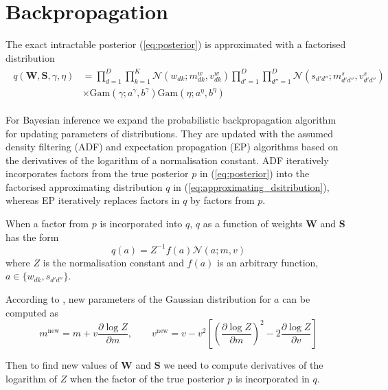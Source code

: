 \documentclass{article}
\begin{document}
\section{Backpropagation}
\label{sec:backpropagation}

The exact intractable posterior (\ref{eq:posterior}) is approximated with a factorised distribution
\begin{align}
\label{eq:approximating_dsitribution}
\begin{split}
q(\mathbf{W}, \mathbf{S}, \gamma, \eta) &= \prod_{d=1}^D\prod_{k=1}^K \mathcal{N}(w_{dk} ; m^w_{dk}, v^w_{dk}) \prod_{d'=1}^D\prod_{d''=1}^D \mathcal{N}(s_{d'd''} ; m^s_{d'd''}, v^s_{d'd''}) \\
&\times \text{Gam}(\gamma; a^\gamma, b^\gamma) \text{Gam}(\eta; a^\eta, b^\eta)
\end{split}
\end{align}

For Bayesian inference we expand the probabilistic backpropagation algorithm~\cite{hernandez2015probabilistic} for updating parameters of distributions. They are updated with the assumed density filtering (ADF) and expectation propagation (EP) algorithms based on the derivatives of the logarithm of a normalisation constant. ADF iteratively incorporates factors from the true posterior $p$ in (\ref{eq:posterior}) into the factorised approximating distribution $q$ in (\ref{eq:approximating_dsitribution}), whereas EP iteratively replaces factors in $q$ by factors from $p$.

When a factor from $p$ is incorporated into $q$, $q$ as a function of weights $\mathbf{W}$ and $\mathbf{S}$ has the form
\begin{equation}
q(a) = Z^{-1}f(a)\mathcal{N}(a; m, v)
\end{equation}
where $Z$ is the normalisation constant and $f(a)$ is an arbitrary function, $a \in \{w_{dk}, s_{d'd''}\}$.

According to \cite{minka2001thesis}, new parameters of the Gaussian distribution for $a$ can be computed as
\begin{equation}
\label{eq:param_update}
m^{\text{new}} = m + v \frac{\partial \log Z}{\partial m}, \qquad
v^{\text{new}} = v - v^2\left[ \left(\frac{\partial \log Z}{\partial m}\right)^2 - 2 \frac{\partial \log Z}{\partial v}\right]
\end{equation}

Then to find new values of $\mathbf{W}$ and $\mathbf{S}$ we need to compute derivatives of the logarithm of $Z$ when the factor of the true posterior $p$ is incorporated in $q$.
\end{document}
